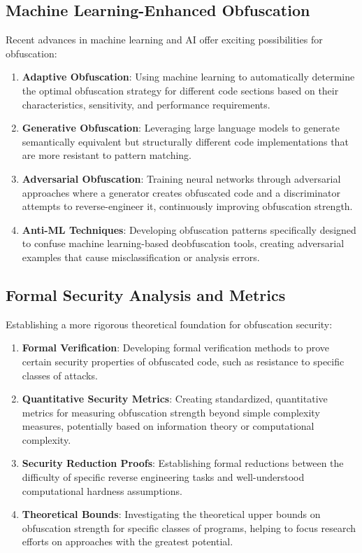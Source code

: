 \documentclass[conference]{IEEEtran}
\begin{document}
\subsection{Machine Learning-Enhanced Obfuscation}

Recent advances in machine learning and AI offer exciting possibilities for obfuscation:

\begin{enumerate}
    \item \textbf{Adaptive Obfuscation}: Using machine learning to automatically determine the optimal obfuscation strategy for different code sections based on their characteristics, sensitivity, and performance requirements.
    
    \item \textbf{Generative Obfuscation}: Leveraging large language models to generate semantically equivalent but structurally different code implementations that are more resistant to pattern matching.
    
    \item \textbf{Adversarial Obfuscation}: Training neural networks through adversarial approaches where a generator creates obfuscated code and a discriminator attempts to reverse-engineer it, continuously improving obfuscation strength.
    
    \item \textbf{Anti-ML Techniques}: Developing obfuscation patterns specifically designed to confuse machine learning-based deobfuscation tools, creating adversarial examples that cause misclassification or analysis errors.
\end{enumerate}

\subsection{Formal Security Analysis and Metrics}

Establishing a more rigorous theoretical foundation for obfuscation security:

\begin{enumerate}
    \item \textbf{Formal Verification}: Developing formal verification methods to prove certain security properties of obfuscated code, such as resistance to specific classes of attacks.
    
    \item \textbf{Quantitative Security Metrics}: Creating standardized, quantitative metrics for measuring obfuscation strength beyond simple complexity measures, potentially based on information theory or computational complexity.
    
    \item \textbf{Security Reduction Proofs}: Establishing formal reductions between the difficulty of specific reverse engineering tasks and well-understood computational hardness assumptions.
    
    \item \textbf{Theoretical Bounds}: Investigating the theoretical upper bounds on obfuscation strength for specific classes of programs, helping to focus research efforts on approaches with the greatest potential.
\end{enumerate}
\end{document}
